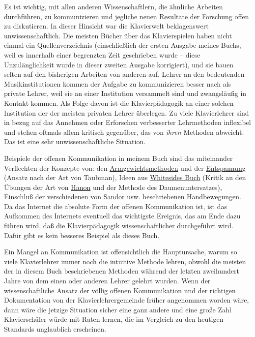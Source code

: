 Es ist wichtig, mit allen anderen Wissenschaftlern, die ähnliche Arbeiten durchführen, zu kommunizieren und jegliche neuen Resultate der Forschung offen zu diskutieren.
In dieser Hinsicht war die Klavierwelt beklagenswert unwissenschaftlich.
Die meisten Bücher über das Klavierspielen haben nicht einmal ein Quellenverzeichnis (einschließlich der ersten Ausgabe meines Buchs, weil es innerhalb einer begrenzten Zeit geschrieben wurde -- diese Unzulänglichkeit wurde in dieser zweiten Ausgabe korrigiert), und sie bauen selten auf den bisherigen Arbeiten von anderen auf.
Lehrer an den bedeutenden Musikinstitutionen kommen der Aufgabe zu kommunizieren besser nach als private Lehrer, weil sie an einer Institution versammelt sind und zwangsläufig in Kontakt kommen.
Als Folge davon ist die Klavierpädagogik an einer solchen Institution der der meisten privaten Lehrer überlegen.
Zu viele Klavierlehrer sind in bezug auf das Annehmen oder Erforschen verbesserter Lehrmethoden inflexibel und stehen oftmals allem kritisch gegenüber, das von \textit{ihren} Methoden abweicht.
Das ist eine sehr unwissenschaftliche Situation.

Beispiele der offenen Kommunikation in meinem Buch sind das miteinander Verflechten der Konzepte von: den \hyperref[c1ii10]{Armgewichtsmethoden} und der \hyperref[c1ii14]{Entspannung} (Ansatz nach der Art von Taubman), Ideen aus \hyperref[Whiteside]{Whitesides Buch} (Kritik an den Übungen der Art von \hyperref[c1iii7h]{Hanon} und der Methode des Daumenuntersatzes), Einschluß der verschiedenen von \hyperref[Sandor]{Sandor} usw. beschriebenen Handbewegungen.
Da das Internet die absolute Form der offenen Kommunikation ist, ist das Aufkommen des Internets eventuell das wichtigste Ereignis, das am Ende dazu führen wird, daß die Klavierpädagogik wissenschaftlicher durchgeführt wird.
Dafür gibt es kein besseres Beispiel als dieses Buch.

Ein Mangel an Kommunikation ist offensichtlich die Hauptursache, warum so viele Klavierlehrer immer noch die intuitive Methode lehren, obwohl die meisten der in diesem Buch beschriebenen Methoden während der letzten zweihundert Jahre von dem einen oder anderen Lehrer gelehrt wurden.
Wenn der wissenschaftliche Ansatz der völlig offenen Kommunikation und der richtigen Dokumentation von der Klavierlehrergemeinde früher angenommen worden wäre, dann wäre die jetzige Situation sicher eine ganz andere und eine große Zahl Klavierschüler würde mit Raten lernen, die im Vergleich zu den heutigen Standards unglaublich erscheinen.

